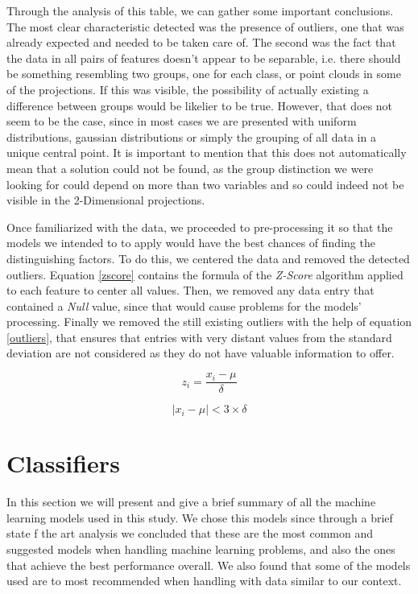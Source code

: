 \documentclass[extendedabs]{recpad2k}
\begin{document}
Through the analysis of this table, we can gather some important conclusions. 
The most clear characteristic detected was the presence of outliers, one that was already expected and needed to be taken care of.
The second was the fact that the data in all pairs of features doesn't appear to be separable, i.e. there should be something resembling two groups, one for 
each class, or point clouds in some of the projections.
If this was visible, the possibility of actually existing a difference between groups would be likelier to be true.
However, that does not seem to be the case, since in most cases we are presented with uniform distributions, gaussian distributions or simply the grouping of 
all data in a unique central point. 
It is important to mention that this does not automatically mean that a solution could not be found, as the group distinction we were looking for could depend 
on more than two variables and so could indeed not be visible in the 2-Dimensional projections.

Once familiarized with the data, we proceeded to pre-processing it so that the models we intended to to apply would have the best chances of finding the 
distinguishing factors.
To do this, we centered the data and removed the detected outliers.
Equation \ref{zscore} contains the formula of the \textit{Z-Score} algorithm applied to each feature to center all values.
Then, we removed any data entry that contained a \textit{Null} value, since that would cause problems for the models' processing.
Finally we removed the still existing outliers with the help of equation \ref{outliers}, that ensures that entries with very distant values from the standard 
deviation are not considered as they do not have valuable information to offer.

\begin{equation}\label{zscore}
   z_{i} = \frac{x_{i} - \mu}{\delta}
\end{equation}

\begin{equation}\label{outliers}
   |x_{i}-\mu| < 3\times\delta
\end{equation}

\section{Classifiers}\label{classifiers}
In this section we will present and give a brief summary of all the machine learning models used in this study. We chose this models since through a brief state 
f the art analysis we concluded that these are the most common and suggested models when handling machine learning problems, and also the ones that achieve the 
best performance overall. We also found that some of the models used are to most recommended when handling with data similar to our context.
\end{document}
